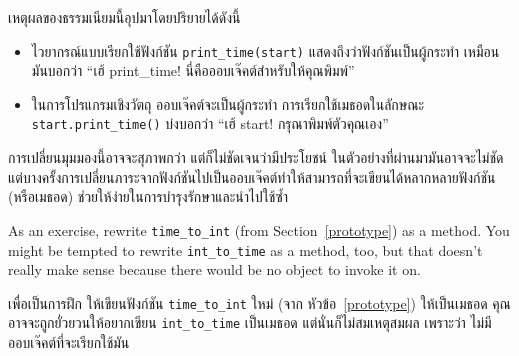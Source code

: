 เหตุผลของธรรมเนียมนี้อุปมาโดยปริยายได้ดังนี้


\begin{itemize}


\item ไวยากรณ์แบบเรียกใช้ฟังก์ชัน \verb|print_time(start)| แสดงถึงว่าฟังก์ชันเป็นผู้กระทำ เหมือนมันบอกว่า ``เฮ้ print\_time!
นี่คือออบเจ๊คต์สำหรับให้คุณพิมพ์''


\item ในการโปรแกรมเชิงวัตถุ ออบเจ๊คต์จะเป็นผู้กระทำ การเรียกใช้เมธอดในลักษณะ \verb"start.print_time()" บ่งบอกว่า ``เฮ้ start!
กรุณาพิมพ์ตัวคุณเอง''

\end{itemize}


การเปลี่ยนมุมมองนี้อาจจะสุภาพกว่า แต่ก็ไม่ชัดเจนว่ามีประโยชน์ ในตัวอย่างที่ผ่านมามันอาจจะไม่ชัด  
แต่บางครั้งการเปลี่ยนภาระจากฟังก์ชันไปเป็นออบเจ๊คต์ทำให้สามารถที่จะเขียนได้หลากหลายฟังก์ชัน (หรือเมธอด) ช่วยให้ง่ายในการบำรุงรักษาและนำไปใช้ซ้ำ

As an exercise, rewrite \verb"time_to_int" (from
Section~\ref{prototype}) as a method.  You might be tempted to
rewrite \verb"int_to_time" as a method, too, but that doesn't
really make sense because there would be no object to invoke
it on.

เพื่อเป็นการฝึก ให้เขียนฟังก์ชัน \verb"time_to_int" ใหม่ (จาก หัวข้อ~\ref{prototype}) ให้เป็นเมธอด คุณอาจจะถูกยั่วยวนให้อยากเขียน \verb"int_to_time" เป็นเมธอด 
แต่นั่นก็ไม่สมเหตุสมผล เพราะว่า ไม่มีออบเจ๊คต์ที่จะเรียกใช้มัน

